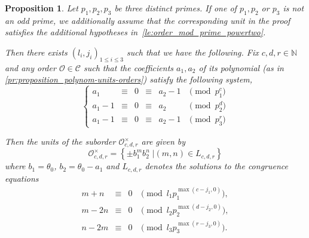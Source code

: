 \documentclass[11pt,letterpaper]{amsart}
\newtheorem{prop}[theorem]{Proposition}
\theoremstyle{definition}
\theoremstyle{remark}
\newcommand{\cal}[1]{\mathcal{#1}}
\newcommand{\bb}[1]{\mathbb{#1}}
\newcommand{\Z}{\bb Z}
\newcommand{\N}{\bb N}
\newcommand{\calC}{\cal C}
\newcommand{\calO}{\cal O}
\newcommand{\nihar}{\color{red}}
\begin{document}
	
	\begin{prop}\label{prop:suborder}
		Let $p_{1},p_{2},p_{3}$ be three distinct primes.
		If one of $p_{1},p_{2}$ or $p_{3}$ is not an odd prime, we additionally assume that the corresponding unit in the proof satisfies the additional hypotheses in~\cref{le:order_mod_prime_powertwo}.	
		
		Then there exists $(l_i,j_i)_{1 \leq i \leq 3}$ such that we have the following. 
		Fix $c,d,r\in \N$ and any order $\calO\in \calC$ such that the coefficients $a_1,a_2$ of its polynomial (as in \cref{pr:proposition_polynom-units-orders}) satisfy
		the following system,
		$$\left\lbrace \begin{array}{ cccccl}
			a_1 &\equiv&0&\equiv& a_2-1 &\pmod{p_1^c}\\
			a_1-1 &\equiv&0&\equiv& a_2 &\pmod{ p_2^d}\\
			a_1-1 &\equiv&0&\equiv& a_2-1 &\pmod{ p_3^r}
		\end{array} \right.$$
		
		\noindent Then the units of the suborder $\calO_{c,d,r}^\times$ are given by %
		$$\calO_{c,d,r}^\times =\left\lbrace \pm b_1^m b_2^n \; \bigg\vert  (m,n)  \in L_{c,d,r} \right\rbrace$$
		where $b_1 = \theta_0$, $b_2 = \theta_0-a_1$ and $L_{c,d,r}$ denotes the solutions to the congruence equations {
			$$\begin{array}{ cccl}
				m+n &\equiv &0 &\pmod{ l_1 p_1^{\max( c-j_1,0)}},\\
				m-2n &\equiv &0 &\pmod{ l_2 p_2^{\max( d-j_2,0)}},\\
				n-2m &\equiv &0 &\pmod{ l_3 p_3^{\max( r-j_3,0)}}.
			\end{array}  $$}
	\end{prop}
\end{document}
